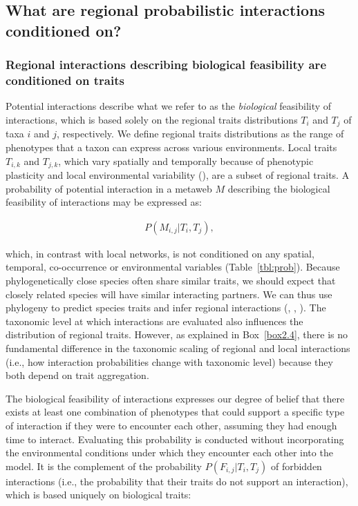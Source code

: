 \subsection{What are regional probabilistic interactions conditioned on?}

\subsubsection{Regional interactions describing biological feasibility are conditioned on traits}

Potential interactions describe what we refer to as the \textit{biological}
feasibility of interactions, which is based solely on the regional traits
distributions $T_i$ and $T_j$ of taxa $i$ and $j$, respectively. We define
regional traits distributions as the range of phenotypes that a taxon can
express across various environments. Local traits $T_{i,k}$ and $T_{j,k}$, which
vary spatially and temporally because of phenotypic plasticity and local
environmental variability (\cite{Berg2010Trait}), are a subset of regional
traits. A probability of potential interaction in a metaweb $M$ describing the
biological feasibility of interactions may be expressed as: 

\begin{eqnarray}
  \label{eq:metaweb}
  P(M_{i, j} | T_i, T_j),
\end{eqnarray}

which, in contrast with local networks, is not conditioned on any spatial,
temporal, co-occurrence or environmental variables (Table~\ref{tbl:prob}).
Because phylogenetically close species often share similar traits, we should
expect that closely related species will have similar interacting partners. We
can thus use phylogeny to predict species traits and infer regional interactions
(\cite{Strydom2022Food}, \cite{Eklof2016Phylogenetic},
\cite{Stouffer2012Evolutionary}). The taxonomic level at which interactions are
evaluated also influences the distribution of regional traits. However, as
explained in Box~\ref{box2.4}, there is no fundamental difference in the taxonomic scaling
of regional and local interactions (i.e., how interaction probabilities change
with taxonomic level) because they both depend on trait aggregation. 

The biological feasibility of interactions expresses our degree of belief that
there exists at least one combination of phenotypes that could support a
specific type of interaction if they were to encounter each other, assuming they
had enough time to interact. Evaluating this probability is conducted without
incorporating the environmental conditions under which they encounter each other
into the model. It is the complement of the probability $P(F_{i, j} | T_i, T_j)$
of forbidden interactions (i.e., the probability that their traits do not
support an interaction), which is based uniquely on biological traits:


